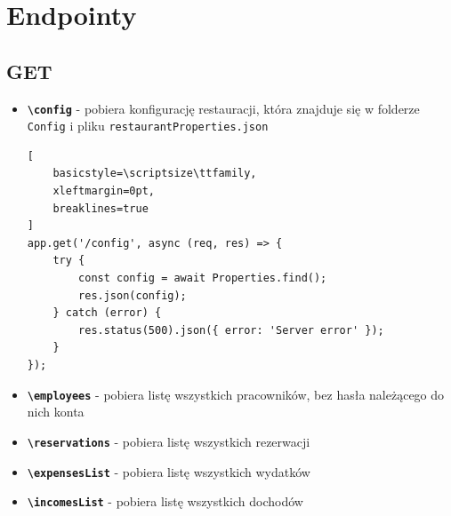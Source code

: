 \documentclass[12pt]{article}
\begin{document}
\newpage
\section{Endpointy}
\subsection{GET}
\begin{itemize}
    \item \textbf{\texttt{\textbackslash config}} - pobiera konfigurację restauracji, która znajduje się w folderze \texttt{Config} i pliku \texttt{restaurantProperties.json}
    \begin{lstlisting}[
    basicstyle=\scriptsize\ttfamily,
    xleftmargin=0pt,
    breaklines=true
]
app.get('/config', async (req, res) => {
    try {
        const config = await Properties.find();
        res.json(config);
    } catch (error) {
        res.status(500).json({ error: 'Server error' });
    }
});
\end{lstlisting}
    \item \textbf{\texttt{\textbackslash employees}} - pobiera listę wszystkich pracowników, bez hasła należącego do nich konta
    \item \textbf{\texttt{\textbackslash reservations}} - pobiera listę wszystkich rezerwacji
    \item \textbf{\texttt{\textbackslash expensesList}} - pobiera listę wszystkich wydatków
    \item \textbf{\texttt{\textbackslash incomesList}} - pobiera listę wszystkich dochodów
\end{itemize}
\end{document}
